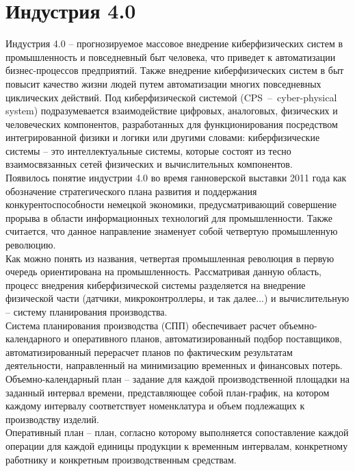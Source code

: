 \section{Индустрия 4.0}
Индустрия 4.0 -- прогнозируемое массовое внедрение киберфизических систем в промышленность и повседневный быт человека, что приведет к автоматизации бизнес-процессов предприятий.
Также внедрение киберфизических систем в быт повысит качество жизни людей путем автоматизации многих повседневных циклических действий.
Под киберфизической системой (CPS~--~cyber-physical system) подразумевается взаимодействие цифровых, аналоговых, физических и человеческих компонентов, разработанных для функционирования посредством интегрированной физики и логики или другими словами: киберфизические системы -- это интеллектуальные системы, которые состоят из тесно взаимосвязанных сетей физических и вычислительных компонентов\cite{nist}.\\
\indent Появилось понятие индустрии 4.0 во время ганноверской выставки 2011 года как обозначение стратегического плана развития и поддержания конкурентоспособности немецкой экономики, предусматривающий совершение прорыва в области информационных технологий для промышленности.
Также считается, что данное направление знаменует собой четвертую промышленную революцию\cite{industry}.\\
\indent Как можно понять из названия, четвертая промышленная революция в первую очередь ориентирована на промышленность.
Рассматривая данную область, процесс внедрения киберфизической системы разделяется на внедрение физической части (датчики, микроконтроллеры, и так далее...) и вычислительную -- систему планирования производства.\\
\indent Система планирования производства (СПП) обеспечивает расчет объемно-календарного и оперативного планов, автоматизированный подбор поставщиков, автоматизированный перерасчет планов по фактическим результатам деятельности, направленный на минимизацию временных и финансовых потерь.\\
\indent Объемно-календарный план -- задание для каждой производственной площадки на заданный интервал времени, представляющее собой план-график, на котором каждому интервалу соответствует номенклатура и объем подлежащих к производству изделий\cite{niokr}.\\
\indent Оперативный план -- план, согласно которому выполняется сопоставление каждой операции для каждой единицы продукции к временным интервалам, конкретному работнику и конкретным производственным средствам\cite{niokr}.\\
